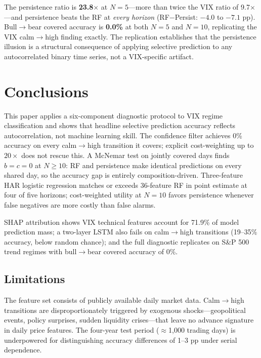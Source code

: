 \documentclass[12pt]{article}
\begin{document}
The persistence ratio is \textbf{23.8$\times$} at $N = 5$---more than twice the VIX ratio of
9.7$\times$---and persistence beats the RF at \emph{every horizon} (RF$-$Persist: $-4.0$ to
$-7.1$ pp). Bull$\to$bear covered accuracy is \textbf{0.0\%} at both $N = 5$ and $N = 10$,
replicating the VIX calm$\to$high finding exactly. The replication establishes that the
persistence illusion is a structural consequence of applying selective prediction to any
autocorrelated binary time series, not a VIX-specific artifact.

\section{Conclusions}
\label{sec:conclusion}

This paper applies a six-component diagnostic protocol to VIX regime classification and shows
that headline selective prediction accuracy reflects autocorrelation, not machine learning skill.
The confidence filter achieves 0\% accuracy on every calm$\to$high transition it covers; explicit
cost-weighting up to $20{\times}$ does not rescue this. A McNemar test on jointly covered days
finds $b = c = 0$ at $N \geq 10$: RF and persistence make identical predictions on every shared
day, so the accuracy gap is entirely composition-driven. Three-feature HAR logistic regression
matches or exceeds 36-feature RF in point estimate at four of five horizons; cost-weighted utility
at $N = 10$ favors persistence whenever false negatives are more costly than false alarms.

SHAP attribution shows VIX technical features account for 71.9\% of model prediction mass; a
two-layer LSTM also fails on calm$\to$high transitions (19--35\% accuracy, below random chance);
and the full diagnostic replicates on S\&P 500 trend regimes with bull$\to$bear covered accuracy
of 0\%.

\subsection*{Limitations}

The feature set consists of publicly available daily market data. Calm$\to$high transitions are
disproportionately triggered by exogenous shocks---geopolitical events, policy surprises, sudden
liquidity crises---that leave no advance signature in daily price features. The four-year test
period ($\approx$1,000 trading days) is underpowered for distinguishing accuracy differences of
1--3 pp under serial dependence.
\end{document}
